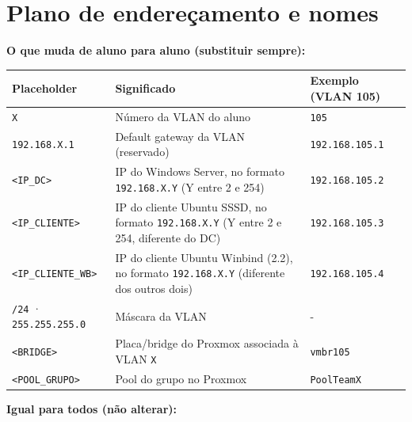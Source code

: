 \section*{Plano de endereçamento e nomes}

\textbf{O que muda de aluno para aluno (substituir sempre):}

\begin{center}\small
\begin{tabularx}{\linewidth}{|>{\raggedright\arraybackslash}X|>{\raggedright\arraybackslash}X|>{\raggedright\arraybackslash}X|}
\hline
\rowcolor{azul!10}\textbf{Placeholder} & \textbf{Significado} & \textbf{Exemplo (VLAN 105)} \\
\hline
\texttt{X} & Número da VLAN do aluno & \texttt{105} \\
\hline
\texttt{192.168.X.1} & Default gateway da VLAN (reservado) & \texttt{192.168.105.1} \\
\hline
\texttt{\textless{}IP\_DC\textgreater{}} & IP do Windows Server, no formato \texttt{192.168.X.Y} (Y entre 2 e 254) & \texttt{192.168.105.2} \\
\hline
\texttt{\textless{}IP\_CLIENTE\textgreater{}} & IP do cliente Ubuntu SSSD, no formato \texttt{192.168.X.Y} (Y entre 2 e 254, diferente do DC) & \texttt{192.168.105.3} \\
\hline
\texttt{\textless{}IP\_CLIENTE\_WB\textgreater{}} & IP do cliente Ubuntu Winbind (2.2), no formato \texttt{192.168.X.Y} (diferente dos outros dois) & \texttt{192.168.105.4} \\
\hline
\texttt{/\allowbreak{}24} · \texttt{255.255.255.0} & Máscara da VLAN & - \\
\hline
\texttt{\textless{}BRIDGE\textgreater{}} & Placa/bridge do Proxmox associada à VLAN \texttt{X} & \texttt{vmbr105} \\
\hline
\texttt{\textless{}POOL\_GRUPO\textgreater{}} & Pool do grupo no Proxmox & \texttt{PoolTeamX} \\
\hline
\end{tabularx}
\end{center}

\textbf{Igual para todos (não alterar):}

